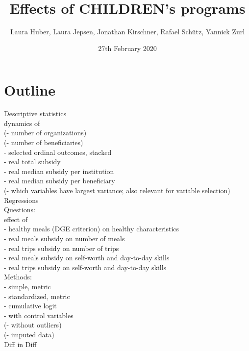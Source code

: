 \documentclass[12pt, a4paper]{article}\usepackage[]{graphicx}\usepackage[]{color}
\title{Effects of CHILDREN's programs}
\author{Laura Huber, Laura Jepsen, Jonathan Kirschner, Rafael Schütz, Yannick Zurl}
\date{27th February 2020}
\begin{document}
\begin{titlepage}
\maketitle
\end{titlepage}

\tableofcontents
\listoftables
\listoffigures

\section{Outline}
Descriptive statistics\\
dynamics of\\ 
(- number of organizations)\\
(- number of beneficiaries)\\
- selected ordinal outcomes, stacked\\
- real total subsidy\\
- real median subsidy per institution\\
- real median subsidy per beneficiary\\
(- which variables have largest variance; also relevant for variable selection)\\

Regressions\\

Questions:\\
effect of\\
- healthy meals (DGE criterion) on healthy characteristics\\
- real meals subsidy on number of meals\\
- real trips subsidy on number of trips\\
- real meals subsidy on self-worth and day-to-day skills\\
- real trips subsidy on self-worth and day-to-day skills\\

Methods:\\
- simple, metric\\
- standardized, metric\\
- cumulative logit\\
- with control variables\\
(- without outliers)\\
(- imputed data)\\

Diff in Diff\\
\end{document}
